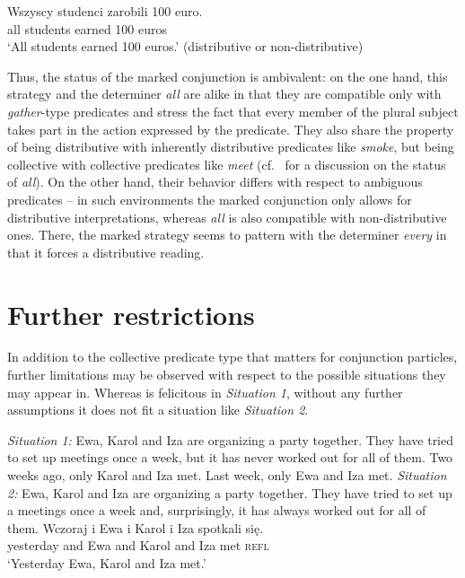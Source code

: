 \documentclass[output=paper]{langscibook}
\begin{document}
\ea\label{ros:all3} \gll Wszyscy studenci zarobili 100 euro. \\
all students earned 100 euros \\
\glt `All students earned 100 euros.' (distributive or non-distributive) 
\z


\noindent Thus, the status of the marked conjunction is ambivalent: on the one hand, this strategy and the determiner \textit{all} are alike in that they are compatible only with \textit{gather}-type predicates and stress the fact that every member of the plural subject takes part in the action expressed by the predicate. They also share the property of being distributive with inherently distributive predicates like \textit{smoke}, but being collective with collective predicates like \textit{meet} (cf.~\citealt{Dowty:1987} for a discussion on the status of \textit{all}). On the other hand, their behavior differs with respect to ambiguous predicates -- in such environments the marked conjunction only allows for distributive interpretations, whereas \textit{all} is also compatible with non-distributive ones. There, the marked strategy seems to pattern with the determiner \textit{every} in that it forces a distributive reading. 


\section{Further restrictions}\label{ros:sec:4}

In addition to the collective predicate type that matters for conjunction particles, further limitations may be observed with respect to the possible situations they may appear in. Whereas  is felicitous in \textit{Situation 1}, without any further assumptions it does not fit a situation like \textit{Situation 2}.

\eanoraggedright
\eanoraggedright\label{ros:c1} \textit{Situation 1:} Ewa, Karol and Iza are organizing a party together. They have tried to set up meetings once a week, but it has never worked out for all of them. Two weeks ago, only Karol and Iza met. Last week, only Ewa and Iza met.
\ex \textit{Situation 2:} Ewa, Karol and Iza are organizing a party together. They have tried to set up a meetings once a week and, surprisingly, it has always worked out for all of them.
\z\ex\label{ros:context-ex1} \gll Wczoraj i Ewa i Karol i Iza spotkali się. \\
yesterday and Ewa and Karol and Iza  met \textsc{refl} \\
\glt `Yesterday Ewa, Karol and Iza met.' 
\z
\end{document}
